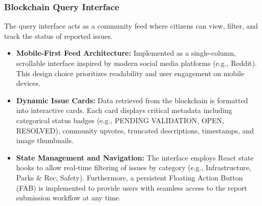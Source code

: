 \subsubsection{Blockchain Query Interface}
The query interface acts as a community feed where citizens can view, filter, and track the status of reported issues.
\begin{itemize}
    \item \textbf{Mobile-First Feed Architecture:} Implemented as a single-column, scrollable interface inspired by modern social media platforms (e.g., Reddit). This design choice prioritizes readability and user engagement on mobile devices.
    \item \textbf{Dynamic Issue Cards:} Data retrieved from the blockchain is formatted into interactive cards. Each card displays critical metadata including categorical status badges (e.g., PENDING VALIDATION, OPEN, RESOLVED), community upvotes, truncated descriptions, timestamps, and image thumbnails.
    \item \textbf{State Management and Navigation:} The interface employs React state hooks to allow real-time filtering of issues by category (e.g., Infrastructure, Parks \& Rec, Safety). Furthermore, a persistent Floating Action Button (FAB) is implemented to provide users with seamless access to the report submission workflow at any time.
\end{itemize}





